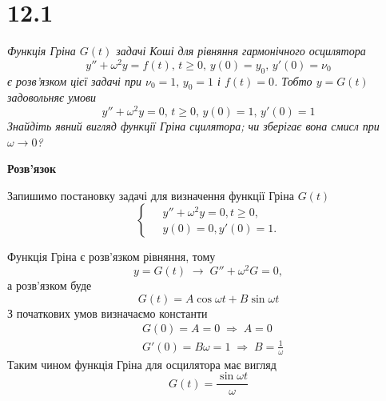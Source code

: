 


%


\section[Задача №12.1]{12.1}

\textit{Функція Гріна $G(t)$ задачі Коші для рівняння гармонічного осцилятора \[y'' + \omega^2y = f(t), \, t \geq 0, \, y(0)=y_0, \, y'(0)=\nu_0\] є розв’язком цієї задачі при $\nu_0 = 1 , \, y_0 = 1$ і $f(t) = 0$. Тобто $y = G(t)$ задовольняє умови \[y'' + \omega^2y = 0, \, t \geq 0, \, y(0)=1, \, y'(0)=1\] Знайдіть явний вигляд функції Гріна сцилятора; чи зберігає вона смисл при $\omega \to 0$?}

\begin{center}
    \large{\textbf{Розв'язок}}
\end{center}

Запишимо постановку задачі для визначення функції Гріна $G(t)$
\begin{equation}
    \left\{ \begin{aligned} \label{cond12,1}
        \;&y'' + \omega^2y = 0, t \geq 0,\\
          &y(0) = 0, y'(0) = 1.
    \end{aligned} \right.
\end{equation}

Функція Гріна є розв'язком рівняння, тому
\begin{equation*}
    y = G(t) \;\to\; G'' + \omega^2G = 0,
\end{equation*}
а розв'язком буде
\begin{equation}
    G(t) = A\cos\omega t + B\sin\omega t
\end{equation}
З початкових умов визначаємо константи
\begin{equation*}
    \begin{aligned}
        &G(0) = A = 0 \;\Rightarrow\; A = 0\\
        &G'(0) = B\omega = 1 \;\Rightarrow\; B = \frac{1}{\omega}
    \end{aligned}
\end{equation*}
Таким чином функція Гріна для осцилятора має вигляд
\begin{equation}
    G(t) = \frac{\sin\omega t}{\omega}
\end{equation}

